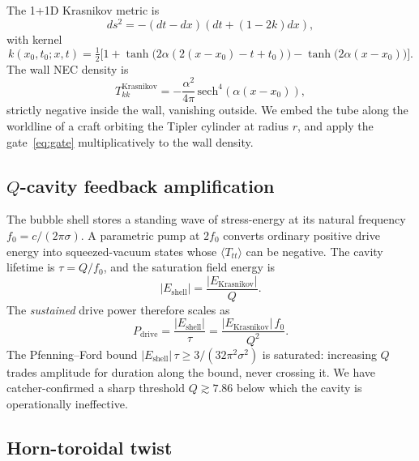 \documentclass[11pt,a4paper]{article}
\begin{document}
The 1+1D Krasnikov metric \cite{Krasnikov1995, EverettRoman1997} is
\begin{equation}
ds^{2} = -(dt-dx)(dt+(1-2k)dx),
\end{equation}
with kernel
\begin{equation}
k(x_{0},t_{0};x,t) = \tfrac{1}{2}\!\bigl[1 + \tanh\!\bigl(2\alpha(2(x-x_{0}) - t + t_{0})\bigr) - \tanh\!\bigl(2\alpha(x-x_{0})\bigr)\bigr].
\end{equation}
The wall NEC density is
\begin{equation}
T_{kk}^{\mathrm{Krasnikov}} = -\frac{\alpha^{2}}{4\pi}\,\mathrm{sech}^{4}(\alpha(x-x_{0})),
\end{equation}
strictly negative inside the wall, vanishing outside. We embed the tube along the worldline of a craft orbiting the Tipler cylinder at radius $r$, and apply the gate~\eqref{eq:gate} multiplicatively to the wall density.

\subsection{$Q$-cavity feedback amplification}\label{ssec:feedback}

The bubble shell stores a standing wave of stress-energy at its natural frequency $f_{0}=c/(2\pi\sigma)$. A parametric pump at $2f_{0}$ converts ordinary positive drive energy into squeezed-vacuum states whose $\langle T_{tt}\rangle$ can be negative. The cavity lifetime is $\tau=Q/f_{0}$, and the saturation field energy is
\begin{equation}
|E_{\mathrm{shell}}| = \frac{|E_{\mathrm{Krasnikov}}|}{Q}.
\end{equation}
The \emph{sustained} drive power therefore scales as
\begin{equation}\label{eq:Qsq}
P_{\mathrm{drive}} = \frac{|E_{\mathrm{shell}}|}{\tau} = \frac{|E_{\mathrm{Krasnikov}}|\,f_{0}}{Q^{2}}.
\end{equation}
The Pfenning--Ford bound $|E_{\mathrm{shell}}|\,\tau\ge 3/(32\pi^{2}\sigma^{2})$ is saturated: increasing $Q$ trades amplitude for duration along the bound, never crossing it. We have catcher-confirmed a sharp threshold $Q\gtrsim 7.86$ below which the cavity is operationally ineffective.

\subsection{Horn-toroidal twist}\label{ssec:horn}
\end{document}
